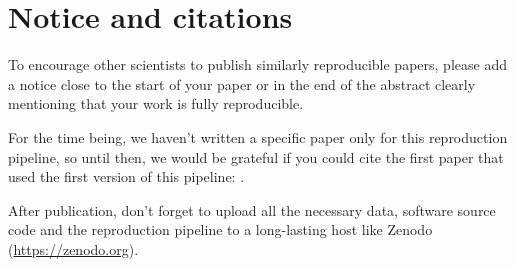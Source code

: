 \documentclass[10pt, twocolumn]{article}
\begin{document}
\section{Notice and citations}
To encourage other scientists to publish similarly reproducible papers,
please add a notice close to the start of your paper or in the end of the
abstract clearly mentioning that your work is fully reproducible.

For the time being, we haven't written a specific paper only for this
reproduction pipeline, so until then, we would be grateful if you could
cite the first paper that used the first version of this pipeline:
\citet{ai15}.

After publication, don't forget to upload all the necessary data, software
source code and the reproduction pipeline to a long-lasting host like
Zenodo (\url{https://zenodo.org}).





\printbibliography

\end{document}
